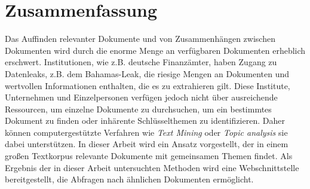\chapter*{Zusammenfassung}

Das Auffinden relevanter Dokumente und von Zusammenhängen zwischen Dokumenten wird durch die enorme Menge an verfügbaren Dokumenten erheblich erschwert.
Institutionen, wie z.B. deutsche Finanzämter, haben Zugang zu Datenleaks, z.B. dem Bahamas-Leak, 
die riesige Mengen an Dokumenten und wertvollen Informationen enthalten, die es zu extrahieren gilt.
Diese Institute, Unternehmen und Einzelpersonen verfügen jedoch nicht über ausreichende Ressourcen, um einzelne Dokumente 
zu durchsuchen, um ein bestimmtes Dokument zu finden oder inhärente Schlüsselthemen zu identifizieren.
Daher können computergestützte Verfahren wie \textit{Text Mining} oder \textit{Topic analysis} sie dabei unterstützen.
In dieser Arbeit wird ein Ansatz vorgestellt, der in einem großen Textkorpus relevante Dokumente mit gemeinsamen Themen findet.
Als Ergebnis der in dieser Arbeit untersuchten Methoden wird eine Webschnittstelle bereitgestellt, die Abfragen nach ähnlichen Dokumenten ermöglicht.